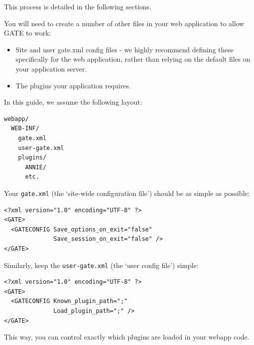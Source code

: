 This process is detailed in the following sections.


You will need to create a number of other files in your web application to
allow GATE to work:
\begin{itemize}
\item
Site and user gate.xml config files - we highly recommend defining these
specifically for the web application, rather than relying on the default files
on your application server.
\item
The plugins your application requires.
\end{itemize}

In this guide, we assume the following layout:
\begin{small}
\begin{verbatim}
webapp/
  WEB-INF/
    gate.xml
    user-gate.xml
    plugins/
      ANNIE/
      etc.
\end{verbatim}
\end{small}


Your {\tt gate.xml} (the `site-wide configuration file') should be as simple
as possible:
\begin{small}
\begin{verbatim}
<?xml version="1.0" encoding="UTF-8" ?>
<GATE>
  <GATECONFIG Save_options_on_exit="false"
              Save_session_on_exit="false" />
</GATE>
\end{verbatim}
\end{small}

Similarly, keep the {\tt user-gate.xml} (the `user config file') simple:
\begin{small}
\begin{verbatim}
<?xml version="1.0" encoding="UTF-8" ?>
<GATE>
  <GATECONFIG Known_plugin_path=";"
              Load_plugin_path=";" />
</GATE>
\end{verbatim}
\end{small}

This way, you can control exactly which plugins are loaded in your webapp code.



